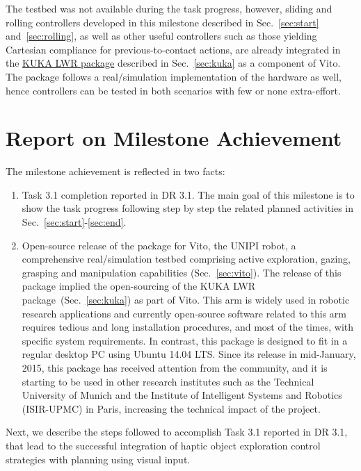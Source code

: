 \documentclass[a4paper,11pt,pdf]{pacmanreport}
\begin{document}
The testbed was not available during the task progress, however, sliding and rolling controllers developed in this milestone described in Sec.~\ref{sec:start} and~\ref{sec:rolling}, as well as other useful controllers such as those yielding Cartesian compliance for previous-to-contact actions, are already integrated in the \href{https://github.com/CentroEPiaggio/kuka-lwr}{KUKA LWR package} described in Sec.~\ref{sec:kuka} as a component of Vito. The package follows a real/simulation implementation of the hardware as well, hence controllers can be tested in both scenarios with few or none extra-effort.

\section{Report on Milestone Achievement}

The milestone achievement is reflected in two facts:
\begin{enumerate}
	\item Task 3.1 completion reported in DR 3.1. The main goal of this milestone is to show the task progress following step by step the related planned activities in Sec.~\ref{sec:start}-\ref{sec:end}.

	\item Open-source release of the package for Vito, the UNIPI robot, a comprehensive real/simulation testbed comprising active exploration, gazing, grasping and manipulation capabilities (Sec.~\ref{sec:vito}). The release of this package implied the open-sourcing of the KUKA LWR package~(Sec.~\ref{sec:kuka}) as part of Vito. This arm is widely used in robotic research applications and currently open-source software related to this arm requires tedious and long installation procedures, and most of the times, with specific system requirements. In contrast, this package is designed to fit in a regular desktop PC using Ubuntu 14.04 LTS. Since its release in mid-January, 2015, this package has received attention from the community, and it is starting to be used in other research institutes such as the Technical University of Munich and the Institute of Intelligent Systems and Robotics (ISIR-UPMC) in Paris, increasing the technical impact of the project.
\end{enumerate}

Next, we describe the steps followed to accomplish Task 3.1 reported in DR 3.1, that lead to the successful integration of haptic object exploration control strategies with planning using visual input.
\end{document}
